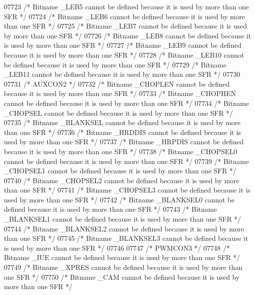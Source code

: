 \begin{DoxyCode}
07723 \textcolor{comment}{/* Bitname \_LEB5 cannot be defined because it is used by more than one SFR */}
07724 \textcolor{comment}{/* Bitname \_LEB6 cannot be defined because it is used by more than one SFR */}
07725 \textcolor{comment}{/* Bitname \_LEB7 cannot be defined because it is used by more than one SFR */}
07726 \textcolor{comment}{/* Bitname \_LEB8 cannot be defined because it is used by more than one SFR */}
07727 \textcolor{comment}{/* Bitname \_LEB9 cannot be defined because it is used by more than one SFR */}
07728 \textcolor{comment}{/* Bitname \_LEB10 cannot be defined because it is used by more than one SFR */}
07729 \textcolor{comment}{/* Bitname \_LEB11 cannot be defined because it is used by more than one SFR */}
07730 
07731 \textcolor{comment}{/* AUXCON2 */}
07732 \textcolor{comment}{/* Bitname \_CHOPLEN cannot be defined because it is used by more than one SFR */}
07733 \textcolor{comment}{/* Bitname \_CHOPHEN cannot be defined because it is used by more than one SFR */}
07734 \textcolor{comment}{/* Bitname \_CHOPSEL cannot be defined because it is used by more than one SFR */}
07735 \textcolor{comment}{/* Bitname \_BLANKSEL cannot be defined because it is used by more than one SFR */}
07736 \textcolor{comment}{/* Bitname \_HRDDIS cannot be defined because it is used by more than one SFR */}
07737 \textcolor{comment}{/* Bitname \_HRPDIS cannot be defined because it is used by more than one SFR */}
07738 \textcolor{comment}{/* Bitname \_CHOPSEL0 cannot be defined because it is used by more than one SFR */}
07739 \textcolor{comment}{/* Bitname \_CHOPSEL1 cannot be defined because it is used by more than one SFR */}
07740 \textcolor{comment}{/* Bitname \_CHOPSEL2 cannot be defined because it is used by more than one SFR */}
07741 \textcolor{comment}{/* Bitname \_CHOPSEL3 cannot be defined because it is used by more than one SFR */}
07742 \textcolor{comment}{/* Bitname \_BLANKSEL0 cannot be defined because it is used by more than one SFR */}
07743 \textcolor{comment}{/* Bitname \_BLANKSEL1 cannot be defined because it is used by more than one SFR */}
07744 \textcolor{comment}{/* Bitname \_BLANKSEL2 cannot be defined because it is used by more than one SFR */}
07745 \textcolor{comment}{/* Bitname \_BLANKSEL3 cannot be defined because it is used by more than one SFR */}
07746 
07747 \textcolor{comment}{/* PWMCON3 */}
07748 \textcolor{comment}{/* Bitname \_IUE cannot be defined because it is used by more than one SFR */}
07749 \textcolor{comment}{/* Bitname \_XPRES cannot be defined because it is used by more than one SFR */}
07750 \textcolor{comment}{/* Bitname \_CAM cannot be defined because it is used by more than one SFR */}

\end{DoxyCode}
